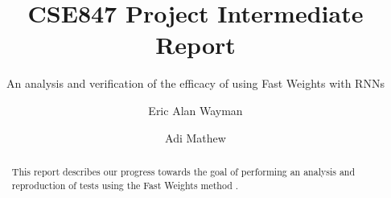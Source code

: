 \documentclass[siggraph, review=false]{acmart}
\begin{document}
\title{CSE847 Project Intermediate Report}
\subtitle{An analysis and verification of the efficacy of using Fast Weights with RNNs}

\author{Eric Alan Wayman}

\author{Adi Mathew}

\begin{abstract}
This report describes our progress towards the goal of performing an analysis and reproduction of tests using the Fast Weights method \cite{DBLP:conf/nips/BaHMLI16}.
\end{abstract}


\maketitle

% 





\end{document}
